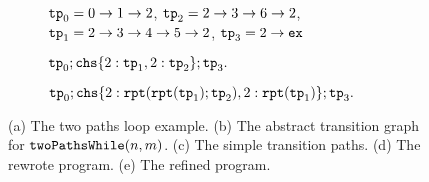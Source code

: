{\begin{figure}
{\begin{subfigure}{.8\textwidth}
\begin{centering}
    $\mathtt{tp}_0 = 0 \to 1 \to 2$,
    $\mathtt{tp}_2 = 2 \to 3 \to 6 \to 2$, \\
    $\mathtt{tp}_1 = 2 \to 3 \to 4 \to 5 \to 2$,
    $\mathtt{tp}_3 = 2 \to \mathtt{ex}$\footnotemark
    \caption{}
\end{centering}
\end{subfigure}
}
{
\begin{subfigure}{.8\textwidth}
\begin{centering}
$
\tpath_0; 
\rpchoose{ 2: \tpath_1, 2: \tpath_2 }; \tpath_3.
$
\caption{}
\end{centering}
\end{subfigure}
}
\begin{subfigure}{.8\textwidth}
  \begin{centering}
  $
  \tpath_0 ; 
  \rpchoose{2: \rprepeat(\rprepeat(\tpath_1); \tpath_2), 
  2: \rprepeat(\tpath_1)}; \tpath_3.
  $
  \caption{}
\end{centering}
  \end{subfigure}
\caption{
(a) The two paths loop example.
(b) The abstract transition graph for $\mathtt{twoPathsWhile}(n, m)$.
(c) The simple transition paths.
(d) The rewrote program.
(e) The refined program.}
    \label{fig:whileTwoCounters-refine}
\end{figure}
}
